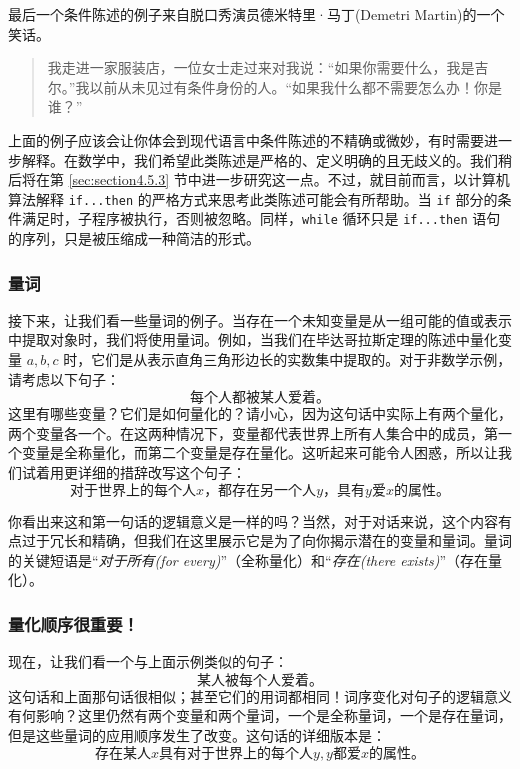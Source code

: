 最后一个条件陈述的例子来自脱口秀演员德米特里·马丁(Demetri Martin)的一个笑话。

\begin{quote}
    我走进一家服装店，一位女士走过来对我说：``如果你需要什么，我是吉尔。''我以前从未见过有条件身份的人。``如果我什么都不需要怎么办！你是谁？''
\end{quote}

上面的例子应该会让你体会到现代语言中条件陈述的不精确或微妙，有时需要进一步解释。在数学中，我们希望此类陈述是严格的、定义明确的且无歧义的。我们稍后将在第 \ref{sec:section4.5.3} 节中进一步研究这一点。不过，就目前而言，以计算机算法解释 \verb|if...then| 的严格方式来思考此类陈述可能会有所帮助。当 \verb|if| 部分的条件满足时，子程序被执行，否则被忽略。同样，\verb|while| 循环只是 \verb|if...then| 语句的序列，只是被压缩成一种简洁的形式。

\subsubsection*{量词}

接下来，让我们看一些量词的例子。当存在一个未知变量是从一组可能的值或表示中提取对象时，我们将使用量词。例如，当我们在毕达哥拉斯定理的陈述中量化变量 $a,b,c$ 时，它们是从表示直角三角形边长的实数集中提取的。对于非数学示例，请考虑以下句子：
\[\text{每个人都被某人爱着。}\]
这里有哪些变量？它们是如何量化的？请小心，因为这句话中实际上有两个量化，两个变量各一个。在这两种情况下，变量都代表世界上所有人集合中的成员，第一个变量是全称量化，而第二个变量是存在量化。这听起来可能令人困惑，所以让我们试着用更详细的措辞改写这个句子：
\[\text{对于世界上的每个人} x\text{，都存在另一个人} y \text{，具有} y \text{爱} x \text{的属性。}\]

你看出来这和第一句话的逻辑意义是一样的吗？当然，对于对话来说，这个内容有点过于冗长和精确，但我们在这里展示它是为了向你揭示潜在的变量和量词。量词的关键短语是``\emph{对于所有(for every)}''（全称量化）和``\emph{存在(there exists)}''（存在量化）。

\subsubsection*{量化顺序很重要！}

现在，让我们看一个与上面示例类似的句子：
\[\text{某人被每个人爱着。}\]
这句话和上面那句话很相似；甚至它们的用词都相同！词序变化对句子的逻辑意义有何影响？这里仍然有两个变量和两个量词，一个是全称量词，一个是存在量词，但是这些量词的应用顺序发生了改变。这句话的详细版本是：
\[\text{存在某人} x \text{具有对于世界上的每个人} y, y \text{都爱} x \text{的属性。}\]

